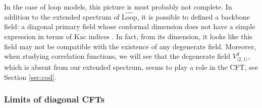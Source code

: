 \documentclass[12pt, a4paper]{article}
\begin{document}
In the case of loop models, this picture is most probably not complete. In addition to the extended spectrum of $\widehat{\text{Loop}}$, it is possible to defined a backbone field: a diagonal primary field whose conformal dimension does not have a simple expression in terms of Kac indices \cite{nqsz23}. In fact, from its dimension, it looks like this field may not be compatible with the existence of any degenerate field. Moreover, when studying correlation functions, we will see that the degenerate field $V^d_{\langle 2,1\rangle}$, which is absent from our extended spectrum, seems to play a role in the CFT, see Section \ref{sec:cod}. 

\subsubsection{Limits of diagonal CFTs}\label{sec:lod}
\end{document}
